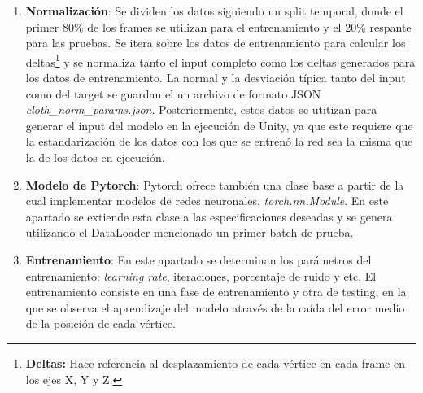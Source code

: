 \begin{enumerate}
    \item \textbf{Normalización}: Se dividen los datos siguiendo un split temporal, donde el primer 80\% de los frames se utilizan para el entrenamiento y el 20\% respante para las pruebas. Se itera sobre los datos de entrenamiento para calcular los deltas\footnote{\textbf{Deltas:} Hace referencia al desplazamiento de cada vértice en cada frame en los ejes X, Y y Z.} y se normaliza tanto el input completo como los deltas generados para los datos de entrenamiento. La normal y la desviación típica tanto del input como del target se guardan el un archivo de formato JSON \textit{cloth\_norm\_params.json}. Posteriormente, estos datos se utitizan para generar el input del modelo en la ejecución de Unity, ya que este requiere que la estandarización de los datos con los que se entrenó la red sea la misma que la de los datos en ejecución.

    \item \textbf{Modelo de Pytorch}: Pytorch ofrece también una clase base a partir de la cual implementar modelos de redes neuronales, \textit{torch.nn.Module}. En este apartado se extiende esta clase a las especificaciones deseadas y se genera utilizando el DataLoader mencionado un primer batch de prueba.
    
    \item \textbf{Entrenamiento}: En este apartado se determinan los parámetros del entrenamiento: \textit{learning rate}, iteraciones, porcentaje de ruido y etc. El entrenamiento consiste en una fase de entrenamiento y otra de testing, en la que se observa el aprendizaje del modelo através de la caída del error medio de la posición de cada vértice.
    

\end{enumerate}
